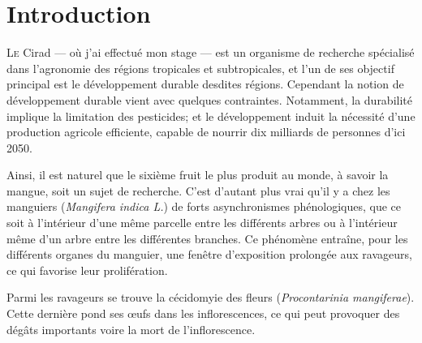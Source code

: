 \chapter{Introduction}

\lettrine{L}{e} Cirad --- où j'ai effectué mon stage --- est un organisme de recherche spécialisé dans l'agronomie des régions tropicales et subtropicales, et l'un de ses objectif principal est le développement durable desdites régions.
Cependant la notion de développement durable vient avec quelques contraintes.
Notamment, la durabilité implique la limitation des pesticides; et le développement induit la nécessité d'une production agricole efficiente, capable de nourrir dix milliards de personnes d'ici 2050.

Ainsi, il est naturel que le sixième fruit le plus produit au monde, à savoir la mangue, soit un sujet de recherche.
C'est d'autant plus vrai qu'il y a chez les manguiers (\emph{Mangifera indica L.}) de forts asynchronismes phénologiques, que ce soit à l'intérieur d'une même parcelle entre les différents arbres ou à l'intérieur même d'un arbre entre les différentes branches. 
Ce phénomène entraîne, pour les différents organes du manguier, une fenêtre d'exposition prolongée aux ravageurs, ce qui favorise leur prolifération. 

Parmi les ravageurs se trouve la cécidomyie des fleurs (\emph{Procontarinia mangiferae}). Cette dernière pond ses œufs dans les inflorescences, ce qui peut provoquer des dégâts importants voire la mort de l'inflorescence.


